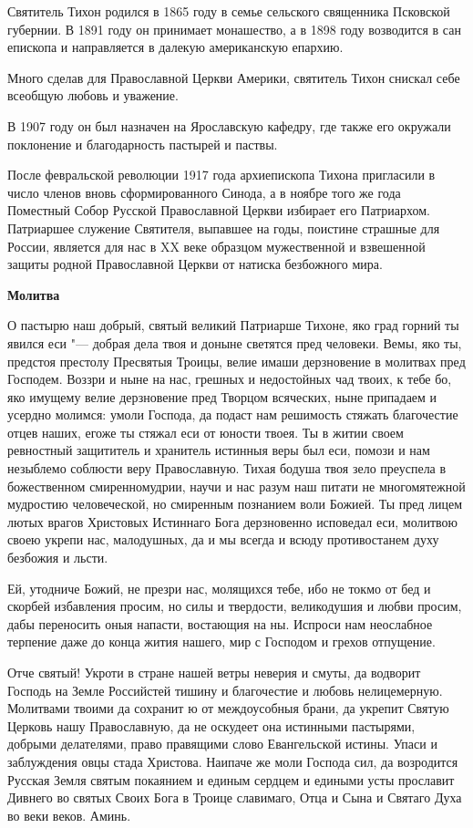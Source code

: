 Святитель Тихон родился в 1865 году в семье сельского священника Псковской губернии. В 1891 году он принимает монашество, а в 1898 году возводится в сан епископа и направляется в далекую американскую епархию. 

Много сделав для Православной Церкви Америки, святитель Тихон снискал себе всеобщую любовь и уважение. 

В 1907 году он был назначен на Ярославскую кафедру, где также его окружали поклонение и благодарность пастырей и паствы. 

После февральской революции 1917 года архиепископа Тихона пригласили в число членов вновь сформированного Синода, а в ноябре того же года Поместный Собор Русской Православной Церкви избирает его Патриархом. Патриаршее служение Святителя, выпавшее на годы, поистине страшные для России, является для нас в XX веке образцом мужественной и взвешенной защиты родной Православной Церкви от натиска безбожного мира.


\medskip
\bfseries Молитва\normalfont{}


О пастырю наш добрый, святый великий Патриарше Тихоне, яко град горний ты явился еси "--- добрая дела твоя и доныне светятся пред человеки. Вемы, яко ты, предстоя престолу Пресвятыя Троицы, велие имаши дерзновение в молитвах пред Господем. Воззри и ныне на нас, грешных и недостойных чад твоих, к тебе бо, яко имущему велие дерзновение пред Творцом всяческих, ныне припадаем и усердно молимся: умоли Господа, да подаст нам решимость стяжать благочестие отцев наших, егоже ты стяжал еси от юности твоея. Ты в житии своем ревностный защититель и хранитель истинныя веры был еси, помози и нам незыблемо соблюсти веру Православную. Тихая бодуша твоя зело преуспела в божественном смиренномудрии, научи и нас разум наш питати не многомятежной мудростию человеческой, но смиренным познанием воли Божией. Ты пред лицем лютых врагов Христовых Истиннаго Бога дерзновенно исповедал еси, молитвою своею укрепи нас, малодушных, да и мы всегда и всюду противостанем духу безбожия и льсти. 

Ей, утодниче Божий, не презри нас, молящихся тебе, ибо не токмо от бед и скорбей избавления просим, но силы и твердости, великодушия и любви просим, дабы переносить оныя напасти, востающия на ны. Испроси нам неослабное терпение даже до конца жития нашего, мир с Господом и грехов отпущение. 

Отче святый! Укроти в стране нашей ветры неверия и смуты, да водворит Господь на Земле Российстей тишину и благочестие и любовь нелицемерную. Молитвами твоими да сохранит ю от междоусобныя брани, да укрепит Святую Церковь нашу Православную, да не оскудеет она истинными пастырями, добрыми делателями, право правящими слово Евангельской истины. Упаси и заблуждения овцы стада Христова. Наипаче же моли Господа сил, да возродится Русская Земля святым покаянием и единым сердцем и едиными усты прославит Дивнего во святых Своих Бога в Троице славимаго, Отца и Сына и Святаго Духа во веки веков. Аминь.

